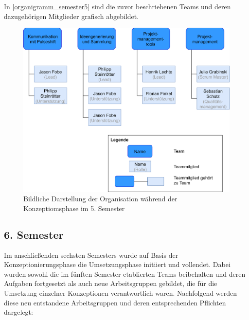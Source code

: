 In \vref{organigramm_semester5} sind die zuvor beschriebenen Teams und deren dazugehörigen Mitglieder grafisch abgebildet.

\begin{figure}[h]
\centering
\includegraphics[width=12cm]{images/organigramm_semester5}
\caption{Bildliche Darstellung der Organisation während der \\ Konzeptiomsphase im 5. Semester\protect}
\label{organigramm_semester5}
\end{figure}

\subsection{6. Semester}

Im anschließenden sechsten Semesters wurde auf Basis der Konzeptionierungsphase die Umsetzungsphase initiiert und vollendet. Dabei wurden sowohl die im fünften Semester etablierten Teams beibehalten und deren Aufgaben fortgesetzt als auch neue Arbeitsgruppen gebildet, die für die Umsetzung einzelner Konzeptionen verantwortlich waren. Nachfolgend werden diese neu entstandene Arbeitsgruppen und deren entsprechenden Pflichten dargelegt:


